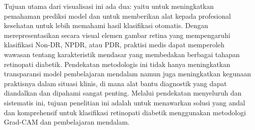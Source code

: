 Tujuan utama dari visualisasi ini ada dua: yaitu untuk meningkatkan pemahaman prediksi model dan untuk memberikan alat kepada profesional kesehatan untuk lebih memahami hasil klasifikasi otomatis. Dengan merepresentasikan secara visual elemen gambar retina yang mempengaruhi klasifikasi Non-DR, NPDR, atau PDR, praktisi medis dapat memperoleh wawasan tentang karakteristik mendasar yang membedakan berbagai tahapan retinopati diabetik. Pendekatan metodologis ini tidak hanya meningkatkan transparansi model pembelajaran mendalam namun juga meningkatkan kegunaan praktisnya dalam situasi klinis, di mana alat bantu diagnostik yang dapat diandalkan dan dipahami sangat penting. Melalui pendekatan menyeluruh dan sistematis ini, tujuan penelitian ini adalah untuk menawarkan solusi yang andal dan komprehensif untuk klasifikasi retinopati diabetik menggunakan metodologi Grad-CAM dan pembelajaran mendalam.
%
%
%
